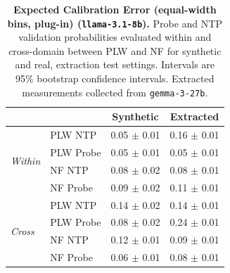 \begin{table}[ht]
\centering
\begin{tabular}{ll cc}
\toprule
& & Synthetic & Extracted \\
\midrule
\multirow{4}{*}{\textit{Within}}
& PLW NTP & 0.05 $\pm$ 0.01 & 0.16 $\pm$ 0.01 \\
& PLW Probe & 0.05 $\pm$ 0.01 & 0.05 $\pm$ 0.01 \\
& NF NTP & 0.08 $\pm$ 0.02 & 0.08 $\pm$ 0.01 \\
& NF Probe & 0.09 $\pm$ 0.02 & 0.11 $\pm$ 0.01 \\
\midrule
\multirow{4}{*}{\textit{Cross}}
& PLW NTP & 0.14 $\pm$ 0.02 & 0.14 $\pm$ 0.01 \\
& PLW Probe & 0.08 $\pm$ 0.02 & 0.24 $\pm$ 0.01 \\
& NF NTP & 0.12 $\pm$ 0.01 & 0.09 $\pm$ 0.01 \\
& NF Probe & 0.06 $\pm$ 0.01 & 0.08 $\pm$ 0.01 \\
\bottomrule
\end{tabular}
\caption{\textbf{Expected Calibration Error (equal-width bins, plug-in) (\texttt{llama-3.1-8b}).} Probe and NTP validation probabilities evaluated within and cross-domain between PLW and NF for synthetic and real, extraction test settings. Intervals are 95\% bootstrap confidence intervals. Extracted measurements collected from \texttt{gemma-3-27b}.}
\label{tab:llama-3.1-8b-gemma-3-27b-pond_nfix-ece}
\end{table}
